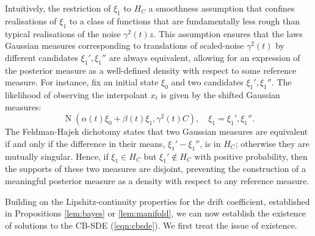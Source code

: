Intuitively, the restriction of \(\xi_{1}\) to \(H_{C}\) a smoothness assumption that confines realisations of \(\xi_{1}\) to a class of functions that are fundamentally less rough than typical realisations of the noise \(\gamma^{2}(t) z\). This assumption ensures that the laws Gaussian measures corresponding to translations of scaled-noise \(\gamma^{2}(t)\) by different candidates \(\xi_{1}', \xi_{1}''\) are always equivalent, allowing for an expression of the posterior measure as a well-defined density with respect to some reference measure. For instance, fix an initial state \(\xi_{0}\) and two candidates \(\xi_{1}', \xi_{1}''\). The likelihood of observing the interpolant \(x_{t}\) is given by the shifted Gaussian measures:
\[\operatorname{N}(\alpha(t) \xi_{0} + \beta(t) \xi_{1}, \gamma^{2}(t) C), \quad \xi_{1} = \xi_{1}',\xi_{1}''.\]
The Feldman-Hajek dichotomy states that two Gaussian measures are equivalent if and only if the difference in their means, \(\xi_{1}' - \xi_{1}''\), is in \(H_{C}\); otherwise they are mutually singular. Hence, if \(\xi_{1} \in H_{C}\) but \(\xi_{1}' \notin H_{C}\) with positive probability, then the supports of these two measures are disjoint, preventing the construction of a meaningful posterior measure as a density with respect to any reference measure.


Building on  the  Lipshitz-continuity properties for the drift coefficient, established in Propositions \ref{lem:bayes} or \ref{lem:manifold}, we can now establish the existence of solutions to the CB-SDE (\ref{eqn:cbsde}). We first treat the issue of existence.

